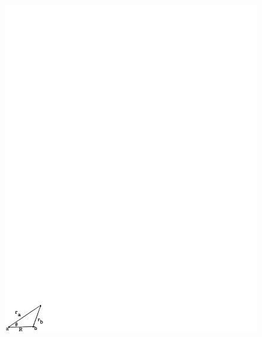 \begin{figure}
\begin{center}
\includegraphics[scale=0.75]{fig2-35}
\end{center}
\caption{}
\label{fig2app-2}
\end{figure}


